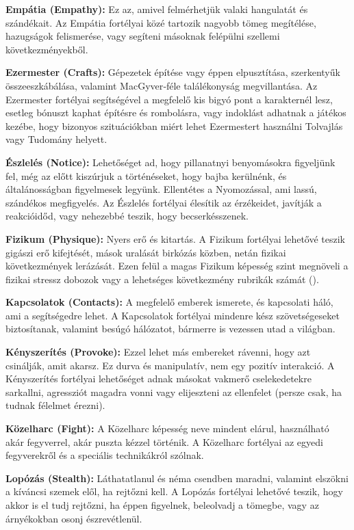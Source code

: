 \textbf{Empátia (Empathy):} Ez az, amivel felmérhetjük valaki hangulatát és szándékait. Az Empátia fortélyai közé tartozik nagyobb tömeg megítélése, hazugságok felismerése, vagy segíteni másoknak felépülni szellemi következményekből.

\textbf{Ezermester (Crafts):} Gépezetek építése vagy éppen elpusztítása, szerkentyűk összeeszkábálása, valamint MacGyver‑féle találékonyság megvillantása. Az Ezermester fortélyai segítségével a megfelelő kis bigyó pont a karakternél lesz, esetleg bónuszt kaphat építésre és rombolásra, vagy indoklást adhatnak a játékos kezébe, hogy bizonyos szituációkban miért lehet Ezermestert használni Tolvajlás vagy Tudomány helyett.

\textbf{Észlelés (Notice):} Lehetőséget ad, hogy pillanatnyi benyomásokra figyeljünk fel, még az előtt kiszúrjuk a történéseket, hogy bajba kerülnénk, és általánosságban figyelmesek legyünk. Ellentétes a Nyomozással, ami lassú, szándékos megfigyelés. Az Észlelés fortélyai élesítik az érzékeidet, javítják a reakcióidőd, vagy nehezebbé teszik, hogy becserkésszenek.

\textbf{Fizikum (Physique):} Nyers erő és kitartás. A Fizikum fortélyai lehetővé teszik gigászi erő kifejtését, mások uralását birkózás közben, netán fizikai következmények lerázását. Ezen felül a magas Fizikum képesség szint megnöveli a fizikai stressz dobozok vagy a lehetséges következmény rubrikák számát ().

\textbf{Kapcsolatok (Contacts):} A megfelelő emberek ismerete, és kapcsolati háló, ami a segítségedre lehet. A Kapcsolatok fortélyai mindenre kész szövetségeseket biztosítanak, valamint besúgó hálózatot, bármerre is vezessen utad a világban.

\newpage

\textbf{Kényszerítés (Provoke):} Ezzel lehet más embereket rávenni, hogy azt csinálják, amit akarsz. Ez durva és manipulatív, nem egy pozitív interakció. A Kényszerítés fortélyai lehetőséget adnak másokat vakmerő cselekedetekre sarkallni, agressziót magadra vonni vagy elijeszteni az ellenfelet (persze csak, ha tudnak félelmet érezni).

\textbf{Közelharc (Fight):} A Közelharc képesség neve mindent elárul, használható akár fegyverrel, akár puszta  kézzel történik. A Közelharc fortélyai az egyedi fegyverekről és a speciális technikákról szólnak.

\textbf{Lopózás (Stealth):} Láthatatlanul és néma csendben maradni, valamint elszökni a kíváncsi szemek elől, ha rejtőzni kell. A Lopózás fortélyai lehetővé teszik, hogy akkor is el tudj rejtőzni, ha éppen figyelnek, beleolvadj a tömegbe, vagy az árnyékokban osonj észrevétlenül.

